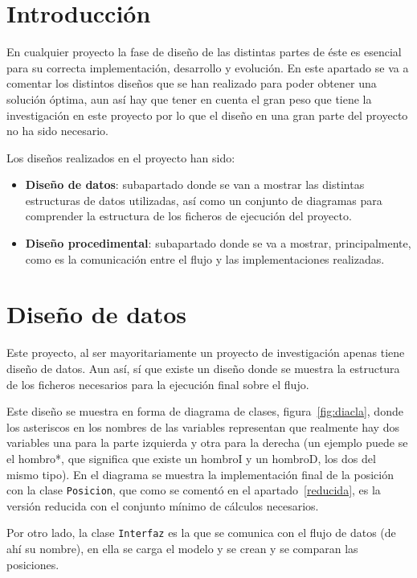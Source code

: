 
\section{Introducción}
En cualquier proyecto la fase de diseño de las distintas partes de éste es esencial para su correcta implementación, desarrollo y evolución. En este apartado se va a comentar los distintos diseños que se han realizado para poder obtener una solución óptima, aun así hay que tener en cuenta el gran peso que tiene la investigación en este proyecto por lo que el diseño en una gran parte del proyecto no ha sido necesario.

Los diseños realizados en el proyecto han sido:
\begin{itemize}
	\item \textbf{Diseño de datos}: subapartado donde se van a mostrar las distintas estructuras de datos utilizadas, así como un conjunto de diagramas para comprender la estructura de los ficheros de ejecución del proyecto.
	\item \textbf{Diseño procedimental}: subapartado donde se va a mostrar, principalmente, como es la comunicación entre el flujo y las implementaciones realizadas.
\end{itemize}
\section{Diseño de datos}

Este proyecto, al ser mayoritariamente un proyecto de investigación apenas tiene diseño de datos. Aun así, sí que existe un diseño donde se muestra la estructura de los ficheros necesarios para la ejecución final sobre el flujo.

Este diseño se muestra en forma de diagrama de clases, figura~\ref{fig:diacla}, donde los asteriscos en los nombres de las variables representan que realmente hay dos variables una para la parte izquierda y otra para la derecha (un ejemplo puede se el hombro*, que significa que existe un hombroI y un hombroD, los dos del mismo tipo). En el diagrama se muestra la implementación final de la posición con la clase \texttt{Posicion}, que como se comentó en el apartado~\ref{reducida}, es la versión reducida con el conjunto mínimo de cálculos necesarios.

Por otro lado, la clase \texttt{Interfaz} es la que se comunica con el flujo de datos (de ahí su nombre), en ella se carga el modelo y se crean y se comparan las posiciones.

